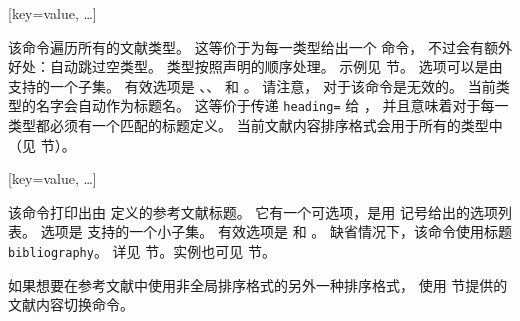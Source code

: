 \begin{ltxsyntax}
[key=value, \dots]


该命令遍历所有的文献类型。
这等价于为每一类型给出一个  命令，
不过会有额外好处：自动跳过空类型。
类型按照声明的顺序处理。
示例见  节。
选项可以是由  支持的一个子集。
有效选项是 、、 和 。
请注意， 对于该命令是无效的。
当前类型的名字会自动作为标题名。
这等价于传递 \texttt{heading=} 给 ，
并且意味着对于每一类型都必须有一个匹配的标题定义。
当前文献内容排序格式会用于所有的类型中（见  节）。

[key=value, \dots]


该命令打印出由  定义的参考文献标题。
它有一个可选项，是用 \keyval 记号给出的选项列表。
选项是  支持的一个小子集。
有效选项是  和 。
缺省情况下，该命令使用标题 \texttt{bibliography}。
详见  节。实例也可见  节。

\end{ltxsyntax}
%
如果想要在参考文献中使用非全局排序格式的另外一种排序格式，
使用  节提供的文献内容切换命令。

